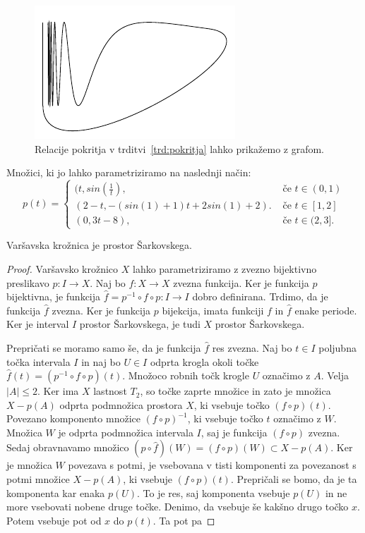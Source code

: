 \documentclass[mat2]{fmfdelo}
\begin{document}
\begin{figure}[h]
  \centering
  \includegraphics{images/varsavska_kroznica.pdf}
  \caption[Primer vektorske slike.]{Relacije pokritja v trditvi~\ref{trd:pokritja} lahko prikažemo z grafom.}
  \label{fig:varšavski}
\end{figure}

\begin{definicija}
Množici, ki jo lahko parametriziramo na naslednji način:
\[ p(t) = \begin{cases}
  (t, sin(\frac{1}{t}), & \mbox{ če $t \in (0, 1) $}\\
 (2-t, -(sin(1) +1)t +2sin(1) +2). & \mbox{ če $t \in [1, 2]$}\\
  (0, 3t-8), & \mbox{ če $t \in (2, 3]$.}
  \end{cases}
  \]
\end{definicija}

\begin{trditev}
Varšavska krožnica je prostor Šarkovskega.
\end{trditev}
\begin{proof}
Varšavsko krožnico $X$ lahko parametriziramo z zvezno bijektivno preslikavo $p:I \to X$. Naj bo $f: X \to X$ zvezna funkcija. Ker je funkcija $p$ bijektivna, je funkcija $\widehat{f} = p^{-1} \circ f \circ p : I \to I$ dobro definirana. Trdimo, da je funkcija $\widehat{f}$ zvezna. Ker je funkcija $p$ bijekcija, imata funkciji $f$ in $\widehat{f}$ enake periode. Ker je interval $I$ prostor Šarkovskega, je tudi $X$ prostor Šarkovskega. 

Prepričati se moramo samo še, da je funkcija $\widehat{f}$ res zvezna. Naj bo $t \in I$ poljubna točka intervala $I$ in naj bo $U \in I$ odprta krogla okoli točke $\widehat{f}(t) = (p^{-1} \circ f \circ p)(t)$. Množoco robnih točk krogle $U$ označimo z $A$. Velja $|A| \leq 2$. Ker ima $X$ lastnost $T_2$, so točke zaprte množice in zato je množica $X - p(A)$ odprta podmnožica prostora $X$, ki vsebuje točko $(f \circ p)(t)$. Povezano komponento množice $(f \circ p)^{-1}$, ki vsebuje točko $t$ označimo z $W$. Množica $W$ je odprta podmnožica intervala $I$, saj je funkcija $(f \circ p)$ zvezna. Sedaj obravnavamo množico $\left(p \circ \widehat{f}\right) (W) = (f \circ p)(W) \subset X - p(A)$. Ker je množica $W$ povezava s potmi, je vsebovana v tisti komponenti za povezanost s potmi množice $X-p(A)$, ki vsebuje $(f \circ p)(t)$. 
Prepričali se bomo, da je ta komponenta kar enaka $p(U)$. To je res, saj komponenta vsebuje $p(U)$ in ne more vsebovati nobene druge točke. Denimo, da vsebuje še kakšno drugo točko $x$. Potem vsebuje pot od $x$ do $p(t)$. Ta pot pa  
\end{proof}
\end{document}
